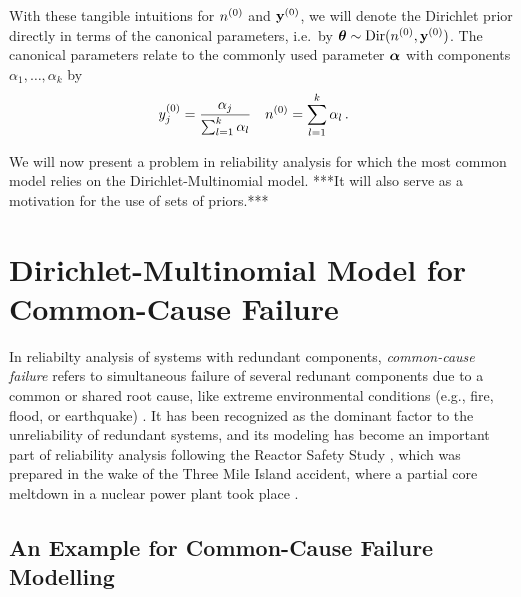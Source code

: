 With these tangible intuitions for $n^{(0)}$ and $\mathbf{y}^{(0)}$,
we will denote the Dirichlet prior directly in terms of the canonical parameters, i.e.\ by
$\boldsymbol{\theta} \sim \operatorname{Dir}(n^{(0)},\mathbf{y}^{(0)})$.
The canonical parameters relate to the commonly used parameter $\boldsymbol{\alpha}$ with components $\alpha_1, \ldots, \alpha_k$ by
\begin{align*}
y^{(0)}_j &= \frac{\alpha_j}{\sum_{l=1}^k \alpha_l} &
n^{(0)}   &= \sum_{l=1}^k \alpha_l \,.
\end{align*}

We will now present a problem in reliability analysis for which the most common model
relies on the Dirichlet-Multinomial model.
***It will also serve as a motivation for the use of sets of priors.***


\section{Dirichlet-Multinomial Model for Common-Cause Failure}
\label{sec:commoncause}

In reliabilty analysis of systems with redundant components,
\emph{common-cause failure} refers to simultaneous failure of several redunant components due to a common or shared root cause,
like extreme environmental conditions (e.g., fire, flood, or earthquake) \cite[p.325]{1994:hoyland}.
It has been recognized as the dominant factor to the unreliability of redundant systems,
and its modeling has become an important part of reliability analysis
following the Reactor Safety Study \cite{1975:reactor:safety:study},
which was prepared in the wake of the Three Mile Island accident,
where a partial core meltdown in a nuclear power plant took place \cite{2005:walker}.

\subsection{An Example for Common-Cause Failure Modelling}

